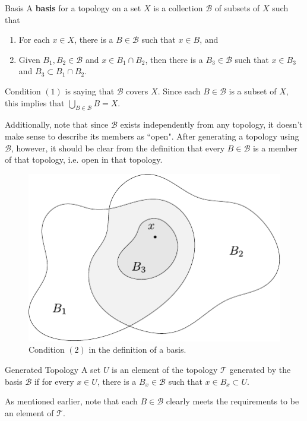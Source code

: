 \documentclass[10pt]{report}
\begin{document}
\begin{defn}{Basis}{}
A \textbf{basis} for a topology on a set $X$ is a collection $\mathcal{B}$ of subsets of $X$ such that
\begin{enumerate}
	\item For each $x \in X$, there is a $B \in \mathcal{B}$ such that $x \in B$, and
	\item Given $B_1,B_2\in \mathcal{B}$ and $x \in B_1 \cap B_2$, then there is a $B_3 \in \mathcal{B}$ such that $x \in B_3$ and $B_3 \subset B_1 \cap B_2$.
\end{enumerate}
\end{defn}
Condition $(1)$ is saying that $\mathcal{B}$ covers $X$. Since each $B \in \mathcal{B}$ is a subset of $X$, this implies that $\bigcup_{B \in \mathcal{B}}B = X$.

Additionally, note that since $\mathcal{B}$ exists independently from any topology, it doesn't make sense to describe its members as ``open". After generating a topology using $\mathcal{B}$, however, it should be clear from the definition that every $B \in \mathcal{B}$ is a member of that topology, i.e. open in that topology.

\begin{figure}[H]
	\centering
	\includegraphics[scale=1]{fig/basis.pdf}
	\caption{Condition $(2)$ in the definition of a basis.}
\end{figure}

\begin{defn}{Generated Topology}{}
A set $U$ is an element of the topology $\mathcal{T}$ generated by the basis $\mathcal{B}$ if for every $x \in U$, there is a $B_x \in \mathcal{B}$ such that $x \in B_x \subset U$.
\end{defn}

As mentioned earlier, note that each $B \in \mathcal{B}$ clearly meets the requirements to be an element of $\mathcal{T}$.
\end{document}
